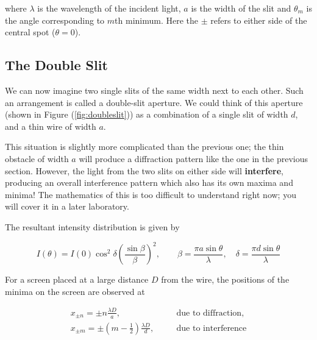 \begin{refsection}
where $\lambda$ is the wavelength of the incident light, $a$ is the width of the slit and $\theta_m$ is the angle corresponding to $m$th minimum. Here the $\pm$ refers to either side of the central spot ($\theta = 0$).


\subsection*{The Double Slit}

We can now imagine two single slits of the same width next to each other. Such an arrangement is called a double-slit aperture. We could think of this aperture (shown in Figure (\ref{fig:doubleslit})) as a combination of a single slit of width $d$, and a thin wire of width $a$. 

This situation is slightly more complicated than the previous one; the thin obstacle of width $a$ will produce a diffraction pattern like the one in the previous section. However, the light from the two slits on either side will \textbf{interfere}, producing an overall interference pattern which also has its own maxima and minima! The mathematics of this is too difficult to understand right now; you will cover it in a later laboratory.

The resultant intensity distribution is given by   

\begin{equation}
    I(\theta) = I(0) \cos^2\delta \left( \frac{\sin \beta}{\beta} \right)^2, \quad \quad  \beta = \frac{\pi a \sin \theta}{\lambda}, \quad \delta = \frac{\pi d \sin \theta}{\lambda}
\end{equation}

For a screen placed at a large distance $D$ from the wire, the positions of the minima on the screen are observed at 

\begin{equation}
    \begin{aligned}
        x_{\pm n} = \pm n \frac{\lambda D}{a}, &\quad& \text{due to diffraction},\\
        x_{\pm m} = \pm \left( m - \frac{1}{2}\right) \frac{\lambda D}{d}, &\quad& \text{due to interference}
    \end{aligned}
    \label{doubleslit}
\end{equation}



\end{refsection}

